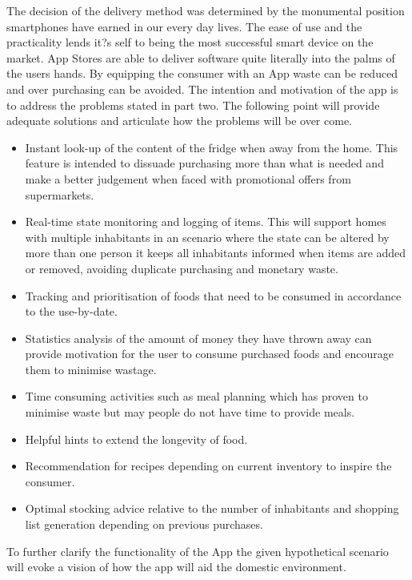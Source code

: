 \documentclass[a4paper, 11pt]{article}
\begin{document}
The decision of the delivery method was determined by the monumental position smartphones have earned in our every day lives. The ease of use and the practicality lends it?s self to being the most successful smart device on the market. App Stores are able to deliver software quite literally into the palms of the users hands. By equipping the consumer with an App waste can be reduced and over purchasing can be avoided. The intention and motivation of the app is to address the problems stated in part two. The following point will provide adequate solutions and articulate how the problems will be over come.


\begin{itemize}
  \item Instant look-up of the content of the fridge when away from the home. This feature is intended to dissuade purchasing more than what is needed and make a better judgement when faced with promotional offers from supermarkets.
  \item Real-time state monitoring and logging of items. This will support homes with multiple inhabitants in an scenario where the state can be altered by more than one person it keeps all inhabitants informed when items are added or removed, avoiding duplicate purchasing and monetary waste.
  \item Tracking and prioritisation of foods that need to be consumed in accordance to the use-by-date. 
   \item Statistics analysis of the amount of money they have thrown away can provide motivation for the user to consume purchased foods and encourage them to minimise wastage.
    \item Time consuming activities such as meal planning which has proven to minimise waste but may people do not have time to provide meals. 
     \item Helpful hints to extend the longevity of food. 
\item Recommendation for recipes depending on current inventory to inspire the consumer.
\item Optimal stocking advice relative to the number of inhabitants and shopping list generation depending on previous purchases. 
 \end{itemize}

To further clarify the functionality of the App the given hypothetical scenario will evoke a vision of how the app will aid the domestic environment.  
\end{document}
